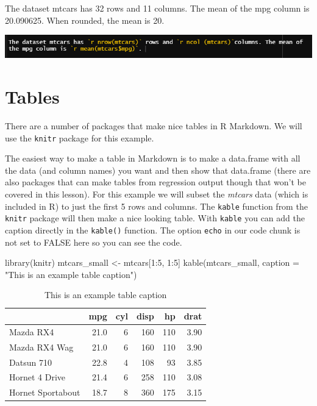 \documentclass[
  12pt,
]{book}
\newenvironment{Shaded}{\begin{snugshade}}{\end{snugshade}}
\newcommand{\AttributeTok}[1]{\textcolor[rgb]{0.61,0.61,0.61}{#1}}
\newcommand{\DecValTok}[1]{\textcolor[rgb]{0.06,0.06,0.06}{#1}}
\newcommand{\FunctionTok}[1]{\textcolor[rgb]{0,0,0}{#1}}
\newcommand{\NormalTok}[1]{#1}
\newcommand{\OtherTok}[1]{\textcolor[rgb]{0.37,0.37,0.37}{#1}}
\newcommand{\SpecialCharTok}[1]{\textcolor[rgb]{0,0,0}{#1}}
\newcommand{\StringTok}[1]{\textcolor[rgb]{0.5,0.5,0.5}{#1}}
\begin{document}
The dataset mtcars has 32 rows and 11 columns. The mean of the mpg column is 20.090625. When rounded, the mean is 20.

\includegraphics{images/inline_code.PNG}

\hypertarget{tables}{%
\section{Tables}\label{tables}}

There are a number of packages that make nice tables in R Markdown. We will use the \texttt{knitr} package for this example.

The easiest way to make a table in Markdown is to make a data.frame with all the data (and column names) you want and then show that data.frame (there are also packages that can make tables from regression output though that won't be covered in this lesson). For this example we will subset the \emph{mtcars} data (which is included in R) to just the first 5 rows and columns. The \texttt{kable} function from the \texttt{knitr} package will then make a nice looking table. With \texttt{kable} you can add the caption directly in the \texttt{kable()} function. The option \texttt{echo} in our code chunk is not set to FALSE here so you can see the code.

\begin{Shaded}
\begin{Highlighting}[]
\FunctionTok{library}\NormalTok{(knitr)}
\NormalTok{mtcars\_small }\OtherTok{\textless{}{-}}\NormalTok{ mtcars[}\DecValTok{1}\SpecialCharTok{:}\DecValTok{5}\NormalTok{, }\DecValTok{1}\SpecialCharTok{:}\DecValTok{5}\NormalTok{]}
\FunctionTok{kable}\NormalTok{(mtcars\_small, }\AttributeTok{caption =} \StringTok{"This is an example table caption"}\NormalTok{)}
\end{Highlighting}
\end{Shaded}

\begin{table}

\caption{\label{tab:unnamed-chunk-1}This is an example table caption}
\centering
\begin{tabular}[t]{l|r|r|r|r|r}
\hline
  & mpg & cyl & disp & hp & drat\\
\hline
Mazda RX4 & 21.0 & 6 & 160 & 110 & 3.90\\
\hline
Mazda RX4 Wag & 21.0 & 6 & 160 & 110 & 3.90\\
\hline
Datsun 710 & 22.8 & 4 & 108 & 93 & 3.85\\
\hline
Hornet 4 Drive & 21.4 & 6 & 258 & 110 & 3.08\\
\hline
Hornet Sportabout & 18.7 & 8 & 360 & 175 & 3.15\\
\hline
\end{tabular}
\end{table}
\end{document}
